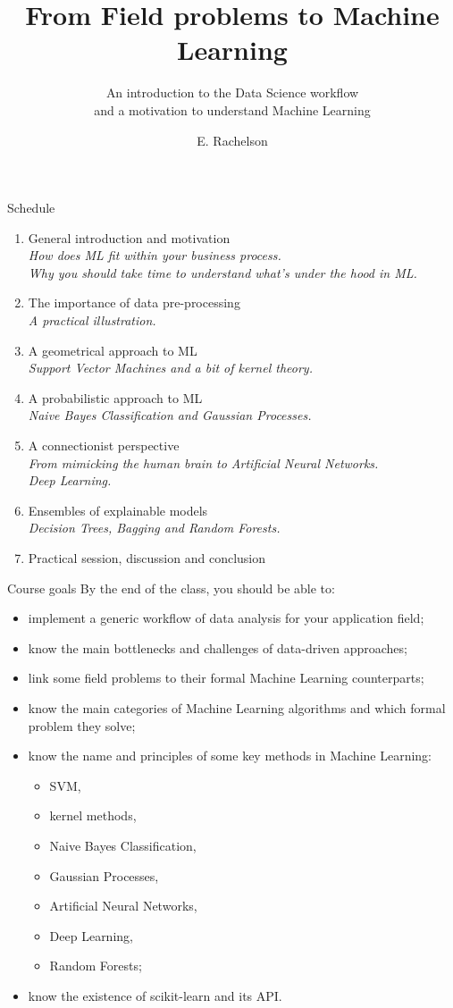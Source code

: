 \documentclass{beamer}
\title[A few topics in Reinforcement Learning]{From Field problems to Machine Learning}
\subtitle{An introduction to the Data Science workflow\\and a motivation to understand Machine Learning}
\author{E. Rachelson}
\institute{\texttt{[image: img/isae.jpg]}}
\date{}
\begin{document}
\begin{frame}[plain]
\titlepage
\end{frame}

\begin{frame}{Schedule}
\begin{enumerate}
\item General introduction and motivation\\
{\small \it How does ML fit within your business process.\\
Why you should take time to understand what's under the hood in ML.}
\item The importance of data pre-processing\\
{\small \it A practical illustration.}
\item A geometrical approach to ML\\
{\small \it Support Vector Machines and a bit of kernel theory.}
\item A probabilistic approach to ML\\
{\small \it Naive Bayes Classification and Gaussian Processes.}
\item A connectionist perspective \\
{\small \it From mimicking the human brain to Artificial Neural Networks.\\
Deep Learning.}
\item Ensembles of explainable models\\
{\small \it Decision Trees, Bagging and Random Forests.}
\item Practical session, discussion and conclusion
\end{enumerate}
\end{frame}

\begin{frame}{Course goals}
\small
By the end of the class, you should be able to:
\begin{itemize}
\item implement a generic workflow of data analysis for your application field;
\item know the main bottlenecks and challenges of data-driven approaches;
\item link some field problems to their formal Machine Learning counterparts;
\item know the main categories of Machine Learning algorithms and which formal problem they solve;
\item know the name and principles of some key methods in Machine Learning:
\begin{itemize}
\item SVM,
\item kernel methods,
\item Naive Bayes Classification,
\item Gaussian Processes,
\item Artificial Neural Networks,
\item Deep Learning,
\item Random Forests;
\end{itemize} 
\item know the existence of scikit-learn and its API.
\end{itemize}
\end{frame}
\end{document}
